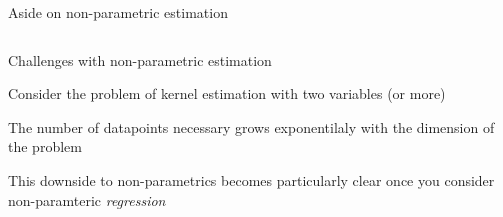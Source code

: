 \documentclass[notes,11pt, aspectratio=169]{beamer}
\newenvironment{wideitemize}{\itemize\addtolength{\itemsep}{10pt}}{\enditemize}
\begin{document}
\begin{frame}{Aside on non-parametric estimation}
\begin{columns}[onlytextwidth, T]
\begin{column}{.3\textwidth}
    \end{column}%
  \end{columns}
\end{frame}


\begin{frame}{Challenges with non-parametric estimation}
  \begin{wideitemize}
  \item   Consider the problem of kernel estimation with two variables (or more)
  \item   The number of datapoints necessary grows exponentilaly with the
    dimension of the problem
  \item   This downside to non-parametrics becomes particularly clear once you
  consider non-paramteric \emph{regression} 
  \end{wideitemize}
\end{frame}
\end{document}
